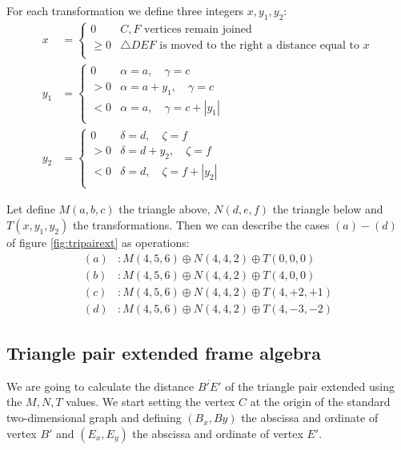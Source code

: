 \documentclass[11pt]{article}
\begin{document}
For each transformation we define three integers $x, y_1, y_2$:
\begin{align}
x &= \left \{ \begin{array}{rl}
 0       &  C,F \mbox{ vertices remain joined}\\
 \geq  0 &  \triangle{DEF} \mbox{ is moved to the right a distance equal to } x \\
 \end{array}\right. \\
y_1 &= \left \{ \begin{array}{rl}
 0   & \alpha = a,\quad \gamma = c \\
 > 0 & \alpha = a + y_1,\quad \gamma = c \\
 < 0 & \alpha = a,\quad \gamma = c + |y_1| \\
 \end{array}\right. \\ 
y_2 &= \left \{ \begin{array}{rl}
 0   & \delta = d,\quad \zeta = f \\
 > 0 & \delta = d + y_2,\quad \zeta = f \\
 < 0 & \delta = d,\quad \zeta = f + |y_2| \\
 \end{array}\right. 
\end{align}

Let define $M(a,b,c)$ the triangle above, $N(d,e,f)$ the triangle below and $T(x,y_1,y_2)$ the transformations.
Then we can describe the cases $(a)-(d)$ of figure \ref{fig:tripairext} as operations:
\begin{align*}
(a) &: M(4,5,6) \oplus N(4,4,2) \oplus T(0,0,0) \\
(b) &: M(4,5,6) \oplus N(4,4,2) \oplus T(4,0,0) \\
(c) &: M(4,5,6) \oplus N(4,4,2) \oplus T(4,+2,+1) \\
(d) &: M(4,5,6) \oplus N(4,4,2) \oplus T(4,-3,-2)
\end{align*}

\subsection{Triangle pair extended frame algebra}

We are going to calculate the distance $\overline{B'E'}$ of the triangle pair extended using the $M,N,T$ values. We start setting the vertex $C$ at the origin of the standard two-dimensional graph and defining $(B_x, By)$ the abscissa and ordinate of vertex $B'$ and
$(E_x, E_y)$ the abscissa and ordinate of vertex $E'$.
\end{document}
